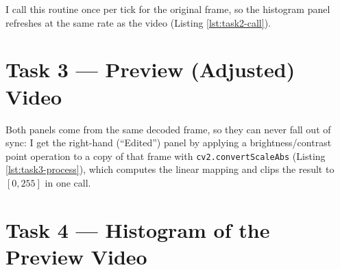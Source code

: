 

I call this routine once per tick for the original frame, so the
histogram panel refreshes at the same rate as the video (Listing
\ref{lst:task2-call}).




\section{Task 3 --- Preview (Adjusted) Video}
\label{sec:task3}



Both panels come from the same decoded frame, so they can never fall
out of sync: I get the right-hand (``Edited'') panel by applying a
brightness/contrast point operation to a copy of that frame with
\texttt{cv2.convertScaleAbs} (Listing \ref{lst:task3-process}), which
computes the linear mapping and clips the result to $[0,255]$ in one
call.






\section{Task 4 --- Histogram of the Preview Video}
\label{sec:task4}


